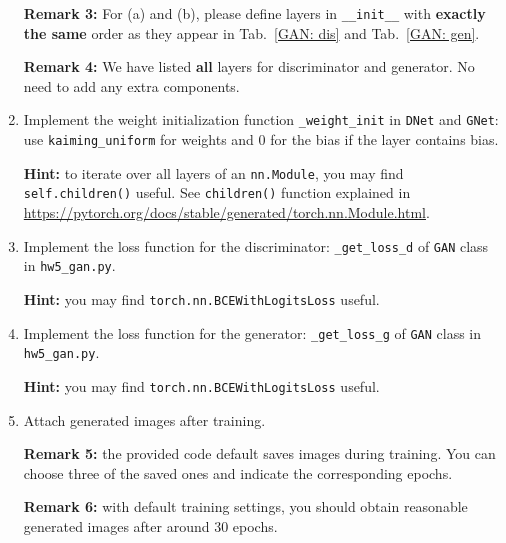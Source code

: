 \begin{Q}
\begin{enumerate}
		\textbf{Remark 3:} For (a) and (b), please define layers in \texttt{\_\_init\_\_} with \textbf{exactly the same} order as they appear in Tab.~\ref{GAN: dis} and Tab.~\ref{GAN: gen}.
		
		\textbf{Remark 4:} We have listed \textbf{all} layers for discriminator and generator. No need to add any extra components.
		
		\item Implement the weight initialization function \texttt{\_weight\_init} in \texttt{DNet} and \texttt{GNet}: use \texttt{kaiming\_uniform} for weights and 0 for the bias if the layer contains bias.
		
		\textbf{Hint:} to iterate over all layers of an \texttt{nn.Module}, you may find \texttt{self.children()} useful. See \texttt{children()} function explained in  \url{https://pytorch.org/docs/stable/generated/torch.nn.Module.html}.
		
		\item Implement the loss function for the discriminator: \texttt{\_get\_loss\_d} of \texttt{GAN} class in \texttt{hw5\_gan.py}.
		
		\textbf{Hint:} you may find \texttt{torch.nn.BCEWithLogitsLoss} useful.
		
		\item Implement the loss function for the generator: \texttt{\_get\_loss\_g} of \texttt{GAN} class in \texttt{hw5\_gan.py}.
		
		\textbf{Hint:} you may find \texttt{torch.nn.BCEWithLogitsLoss} useful.
		
		\item Attach generated images after training.
		
		\textbf{Remark 5:} the provided code default saves images during training. You can choose three of the saved ones and indicate the corresponding epochs.
		
		\textbf{Remark 6:} with default training settings, you should obtain reasonable generated images after around 30 epochs.
		
	\end{enumerate}
	
\end{Q}


